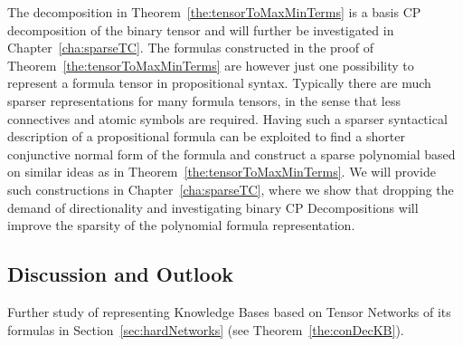 \begin{remark}
	The decomposition in Theorem~\ref{the:tensorToMaxMinTerms} is a basis CP decomposition of the binary tensor and will further be investigated in Chapter~\ref{cha:sparseTC}. 
	The formulas constructed in the proof of Theorem~\ref{the:tensorToMaxMinTerms} are however just one possibility to represent a formula tensor in propositional syntax.
	Typically there are much sparser representations for many formula tensors, in the sense that less connectives and atomic symbols are required.
	Having such a sparser syntactical description of a propositional formula can be exploited to find a shorter conjunctive normal form of the formula and construct a sparse polynomial based on similar ideas as in Theorem~\ref{the:tensorToMaxMinTerms}.
	We will provide such constructions in Chapter~\ref{cha:sparseTC}, where we show that dropping the demand of directionality and investigating binary CP Decompositions will improve the sparsity of the polynomial formula representation.
\end{remark}


\subsection{Discussion and Outlook}

Further study of representing Knowledge Bases based on Tensor Networks of its formulas in Section~\ref{sec:hardNetworks} (see Theorem~\ref{the:conDecKB}).




